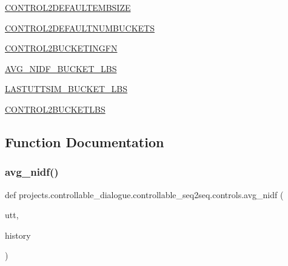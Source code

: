 \begin{DoxyCompactItemize}
\hyperlink{namespaceprojects_1_1controllable__dialogue_1_1controllable__seq2seq_1_1controls_ac2ef7a7e371448e63a7085814cf50160}{C\+O\+N\+T\+R\+O\+L2\+D\+E\+F\+A\+U\+L\+T\+E\+M\+B\+S\+I\+ZE}
\item 
\hyperlink{namespaceprojects_1_1controllable__dialogue_1_1controllable__seq2seq_1_1controls_aaa31ed927f83d45e619b0da333e2aeda}{C\+O\+N\+T\+R\+O\+L2\+D\+E\+F\+A\+U\+L\+T\+N\+U\+M\+B\+U\+C\+K\+E\+TS}
\item 
\hyperlink{namespaceprojects_1_1controllable__dialogue_1_1controllable__seq2seq_1_1controls_a06fb2f27e69d21a2d300f8f8790c2cf3}{C\+O\+N\+T\+R\+O\+L2\+B\+U\+C\+K\+E\+T\+I\+N\+G\+FN}
\item 
\hyperlink{namespaceprojects_1_1controllable__dialogue_1_1controllable__seq2seq_1_1controls_ab731f26e89bf99efc704ffdcc152d087}{A\+V\+G\+\_\+\+N\+I\+D\+F\+\_\+B\+U\+C\+K\+E\+T\+\_\+\+L\+BS}
\item 
\hyperlink{namespaceprojects_1_1controllable__dialogue_1_1controllable__seq2seq_1_1controls_a9197a104df64de7dd914b128082c5f7e}{L\+A\+S\+T\+U\+T\+T\+S\+I\+M\+\_\+B\+U\+C\+K\+E\+T\+\_\+\+L\+BS}
\item 
\hyperlink{namespaceprojects_1_1controllable__dialogue_1_1controllable__seq2seq_1_1controls_a4ec61ac32d9ad15cae102ba352f4b0fd}{C\+O\+N\+T\+R\+O\+L2\+B\+U\+C\+K\+E\+T\+L\+BS}
\end{DoxyCompactItemize}


\subsection{Function Documentation}
\mbox{\label{namespaceprojects_1_1controllable__dialogue_1_1controllable__seq2seq_1_1controls_a962ffde4150bf72ac52327fb4f0a3c78}} 
\subsubsection{\texorpdfstring{avg\+\_\+nidf()}{avg\_nidf()}}
{\footnotesize\ttfamily def projects.\+controllable\+\_\+dialogue.\+controllable\+\_\+seq2seq.\+controls.\+avg\+\_\+nidf (\begin{DoxyParamCaption}\item[{}]{utt,  }\item[{}]{history }\end{DoxyParamCaption})}

